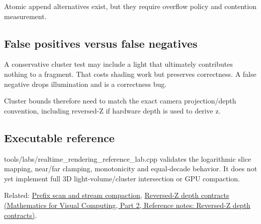 Atomic append alternatives exist, but they require overflow policy and contention measurement.

\subsection{False positives versus false negatives}\label{appendix-b0efeb3f3648-false-positives-versus-false-negatives}

\hypertarget{appendix-b0efeb3f3648-false-positives-versus-false-negatives}{}

A conservative cluster test may include a light that ultimately contributes nothing to a fragment. That costs shading work but preserves correctness. A false negative drops illumination and is a correctness bug.

Cluster bounds therefore need to match the exact camera projection/depth convention, including reversed-Z if hardware depth is used to derive z.

\subsection{Executable reference}\label{appendix-b0efeb3f3648-executable-reference}

\hypertarget{appendix-b0efeb3f3648-executable-reference}{}

tools/labs/realtime\_rendering\_reference\_lab.cpp validates the logarithmic slice mapping, near/far clamping, monotonicity and equal-decade behavior. It does not yet implement full 3D light-volume/cluster intersection or GPU compaction.

Related: \hyperref[appendix-f2ee4d086415]{Prefix scan and stream compaction}, \href{../02-Mathematics-for-Visual-Computing-P02/main.pdf\#nameddest=appendix-275ec8847057}{Reversed-Z depth contracts (Mathematics for Visual Computing, Part 2, Reference notes: Reversed-Z depth contracts)}.
